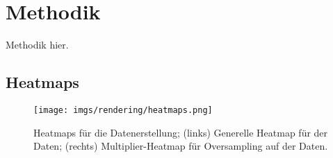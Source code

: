 
\section{Methodik}
\label{sec:daten:methodik}

Methodik hier.

\subsection{Heatmaps}
\label{sec:heatmaps}

\begin{figure}
    \centering
    \texttt{[image: imgs/rendering/heatmaps.png]}
    \caption{Heatmaps für die Datenerstellung; (links) Generelle Heatmap für  der Daten; (rechts) Multiplier-Heatmap für Oversampling auf  der Daten.}
    \label{img:heatmaps}
\end{figure}


